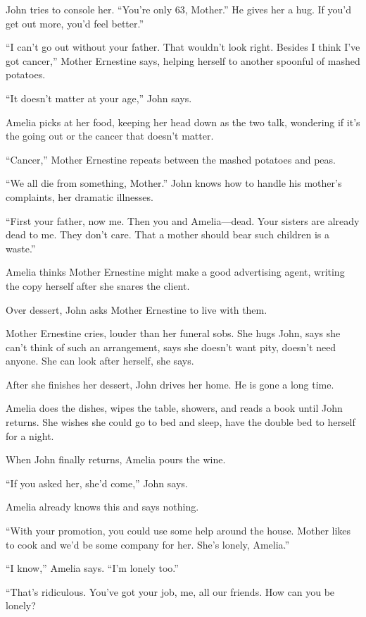 \documentclass[
]{article}
\begin{document}
John tries to console her. ``You're only 63, Mother.'' He gives her a
hug. If you'd get out more, you'd feel better.''

``I can't go out without your father. That wouldn't look right. Besides
I think I've got cancer,'' Mother Ernestine says, helping herself to
another spoonful of mashed potatoes.

``It doesn't matter at your age,'' John says.

Amelia picks at her food, keeping her head down as the two talk,
wondering if it's the going out or the cancer that doesn't matter.

``Cancer,'' Mother Ernestine repeats between the mashed potatoes and
peas.

``We all die from something, Mother.'' John knows how to handle his
mother's complaints, her dramatic illnesses.

``First your father, now me. Then you and Amelia---dead. Your sisters
are already dead to me. They don't care. That a mother should bear such
children is a waste.''

Amelia thinks Mother Ernestine might make a good advertising agent,
writing the copy herself after she snares the client.

Over dessert, John asks Mother Ernestine to live with them.

Mother Ernestine cries, louder than her funeral sobs. She hugs John,
says she can't think of such an arrangement, says she doesn't want pity,
doesn't need anyone. She can look after herself, she says.

After she finishes her dessert, John drives her home. He is gone a long
time.

Amelia does the dishes, wipes the table, showers, and reads a book until
John returns. She wishes she could go to bed and sleep, have the double
bed to herself for a night.

When John finally returns, Amelia pours the wine.

``If you asked her, she'd come,'' John says.

Amelia already knows this and says nothing.

``With your promotion, you could use some help around the house. Mother
likes to cook and we'd be some company for her. She's lonely, Amelia.''

``I know,'' Amelia says. ``I'm lonely too.''

``That's ridiculous. You've got your job, me, all our friends. How can
you be lonely?
\end{document}
